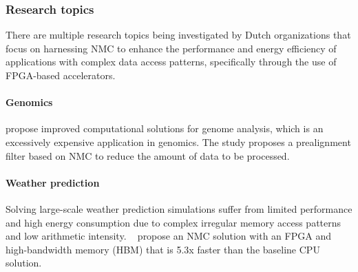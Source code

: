 \subsubsection*{\bf{Research topics}}
There are multiple research topics being investigated by Dutch organizations that focus on harnessing NMC to enhance the performance and energy efficiency of applications with complex data access patterns, specifically through the use of FPGA-based accelerators.

\paragraph{Genomics} \citet{Singh2021FPGA-BasedApplications} %
propose improved computational solutions for genome analysis, which is an excessively expensive application in genomics. The study %
proposes a prealignment filter based on NMC to reduce the amount of data to be processed. %
\paragraph{Weather prediction} Solving large-scale weather prediction simulations suffer from limited performance and high energy consumption due to complex irregular memory access patterns and low arithmetic intensity. ~\citet{Singh2022AcceleratingFabric} %
propose %
an NMC solution with an FPGA and high-bandwidth memory (HBM) that is 5.3x faster than the baseline CPU solution. %
